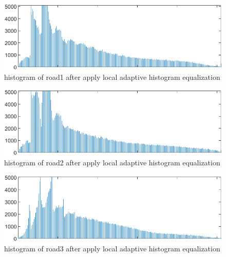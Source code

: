 \documentclass[
	12pt, %
]{fphw}
\begin{document}
\begin{figure}[H]
 
	\centering
	\includegraphics[width=1\columnwidth]{T2/result/hist1_local.png} 
	\caption{histogram of road1 after apply local adaptive histogram equalization}
	\label{fig19}
\end{figure}
\begin{figure}[H]
 
	\centering
	\includegraphics[width=1\columnwidth]{T2/result/hist2_local.png} 
	\caption{histogram of road2 after apply local adaptive histogram equalization}
	\label{fig20}
\end{figure}
\begin{figure}[H]
 
	\centering
	\includegraphics[width=1\columnwidth]{T2/result/hist3_local.png} 
	\caption{histogram of road3 after apply local adaptive histogram equalization}
	\label{fig21}
\end{figure}
\end{document}
